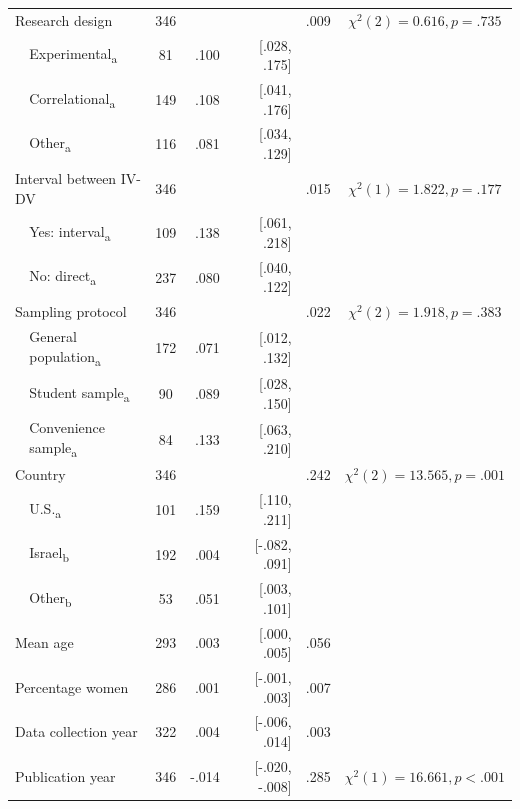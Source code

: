 \begin{ThreePartTable}
\begin{longtable}[c]{llcrrcc}
\multicolumn{2}{l}{Research design} & 346 &  &  & .009 & $\chi^2(2)=0.616, p=.735$ \\
 & Experimental\textsubscript{a} & 81 & .100 & [.028, .175] &  &  \\
 & Correlational\textsubscript{a} & 149 & .108 & [.041, .176] &  &  \\
 & Other\textsubscript{a} & 116 & .081 & [.034, .129] &  &  \\
\multicolumn{2}{l}{Interval between IV-DV} & 346 &  &  & .015 & $\chi^2(1)=1.822, p=.177$ \\
 & Yes: interval\textsubscript{a} & 109 & .138 & [.061, .218] &  &  \\
 & No: direct\textsubscript{a} & 237 & .080 & [.040, .122] &  &  \\
\multicolumn{2}{l}{Sampling protocol} & 346 &  &  & .022 & $\chi^2(2)=1.918, p=.383$ \\
 & General population\textsubscript{a} & 172 & .071 & [.012, .132] &  &  \\
 & Student sample\textsubscript{a} & 90 & .089 & [.028, .150] &  &  \\
 & Convenience sample\textsubscript{a} & 84 & .133 & [.063, .210] &  &  \\
\multicolumn{2}{l}{Country} & 346 &  &  & .242 & $\chi^2(2)=13.565, p=.001$ \\
 & U.S.\textsubscript{a} & 101 & .159 & [.110, .211] &  &  \\
 & Israel\textsubscript{b} & 192 & .004 & [-.082, .091] &  &  \\
 & Other\textsubscript{b} & 53 & .051 & [.003, .101] &  &  \\
\multicolumn{2}{l}{Mean age} & 293 & .003 & [.000, .005] & .056 &  \\
\multicolumn{2}{l}{Percentage women} & 286 & .001 & [-.001, .003] & .007 &  \\
\multicolumn{2}{l}{Data collection year} & 322 & .004 & [-.006, .014] & .003 &  \\
\multicolumn{2}{l}{Publication year} & 346 & -.014 & [-.020, -.008] & .285 & $\chi^2(1)=16.661, p<.001$ \\* \bottomrule
\end{longtable}
\end{ThreePartTable}


